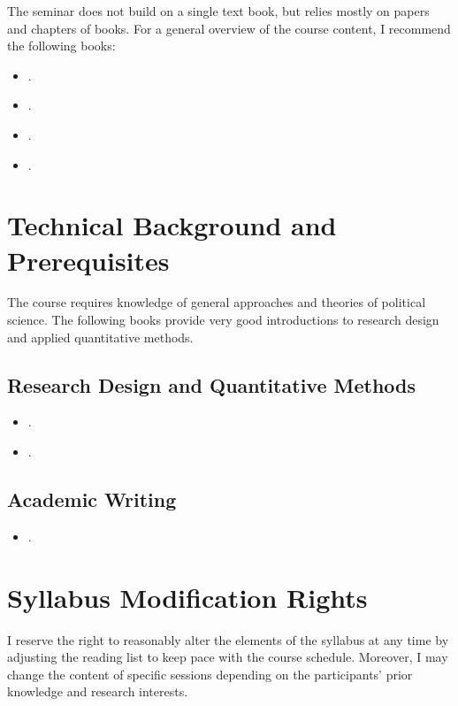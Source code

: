 \documentclass[abstract=on,parskip=full,headings=standardclasses,fontsize=11pt,paper=a4]{scrartcl}
\begin{document}
The seminar does not build on a single text book, but relies mostly on papers and chapters of books. For  a general overview of the course content, I recommend the following books:

\begin{itemize}
\item {}.
\item {}.
\item {}.
\item {}.
\end{itemize}




\section*{Technical Background and Prerequisites}

The course requires knowledge of general approaches and theories of political science. The following books provide very good introductions to research design and applied quantitative methods.

\subsection*{Research Design and Quantitative Methods}
\begin{itemize}
\item {}.
\item {}.
\end{itemize}

\subsection*{Academic Writing}
\begin{itemize}
\item {}.
\end{itemize}


\section*{Syllabus Modification Rights}

I reserve the right to reasonably alter the elements of the syllabus at any time by adjusting the reading list to keep pace with the course schedule. Moreover, I may change the content of specific sessions depending on the participants' prior knowledge and research interests.
\end{document}
